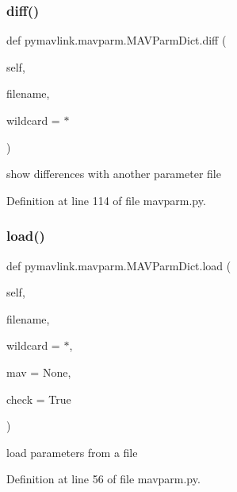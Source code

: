 \subsubsection{\texorpdfstring{diff()}{diff()}}
{\footnotesize\ttfamily def pymavlink.\+mavparm.\+M\+A\+V\+Parm\+Dict.\+diff (\begin{DoxyParamCaption}\item[{}]{self,  }\item[{}]{filename,  }\item[{}]{wildcard = {\ttfamily \textquotesingle{}$\ast$\textquotesingle{}} }\end{DoxyParamCaption})}

\begin{DoxyVerb}show differences with another parameter file\end{DoxyVerb}
 

Definition at line 114 of file mavparm.\+py.

\mbox{\label{classpymavlink_1_1mavparm_1_1MAVParmDict_a08dd4eae81157f5940a29c86114f89c4}} 
\subsubsection{\texorpdfstring{load()}{load()}}
{\footnotesize\ttfamily def pymavlink.\+mavparm.\+M\+A\+V\+Parm\+Dict.\+load (\begin{DoxyParamCaption}\item[{}]{self,  }\item[{}]{filename,  }\item[{}]{wildcard = {\ttfamily \textquotesingle{}$\ast$\textquotesingle{}},  }\item[{}]{mav = {\ttfamily None},  }\item[{}]{check = {\ttfamily True} }\end{DoxyParamCaption})}

\begin{DoxyVerb}load parameters from a file\end{DoxyVerb}
 

Definition at line 56 of file mavparm.\+py.

\mbox{\label{classpymavlink_1_1mavparm_1_1MAVParmDict_aa041ae6aca1eaf554e068912dfd56cae}} 

